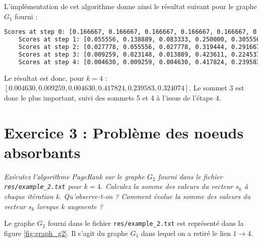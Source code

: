 L'implémentation de cet algorithme donne ainsi le résultat suivant pour le graphe $G_1$ fourni :

\begin{minipage}{\dimexpr\linewidth-20pt}
\begin{lstlisting}[language=bash, caption={Résultat de l'algorithme PageRank sur le graphe $G_1$ fourni, pour $k = 4$.}]
    Scores at step 0: [0.166667, 0.166667, 0.166667, 0.166667, 0.166667, 0.166667]
    Scores at step 1: [0.055556, 0.138889, 0.083333, 0.250000, 0.305556, 0.166667]
    Scores at step 2: [0.027778, 0.055556, 0.027778, 0.319444, 0.291667, 0.277778]
    Scores at step 3: [0.009259, 0.023148, 0.013889, 0.423611, 0.224537, 0.305556]
    Scores at step 4: [0.004630, 0.009259, 0.004630, 0.417824, 0.239583, 0.324074]
\end{lstlisting}
\end{minipage}

Le résultat est donc, pour $k = 4$ : $[0.004630, 0.009259, 0.004630, 0.417824, 0.239583, 0.324074]$. Le sommet 3 est donc le plus important, suivi des sommets 5 et 4 à l'issue de l'étape 4.

\section{Exercice 3 : Problème des noeuds absorbants}

\textit{Exécutez l'algorithme PageRank sur le graphe $G_2$ fourni dans le fichier \texttt{res/example\_2.txt} pour $k = 4$. Calculez la somme des valeurs du vecteur $s_k$ à chaque itération k. Qu'observe-t-on ? Comment évolue la somme des valeurs du vecteur $s_k$ lorsque $k$ augmente ?}

Le graphe $G_2$ fourni dans le fichier \texttt{res/example\_2.txt} est représenté dans la figure \ref{fig:graph_g2}. Il s'agit du graphe $G_1$ dans lequel on a retiré le lien $1 \rightarrow 4$.

